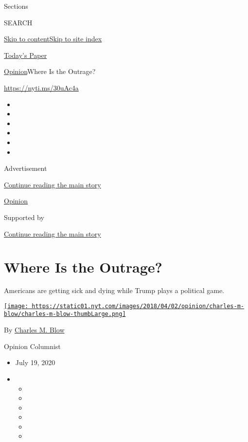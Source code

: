 Sections

SEARCH

\protect\hyperlink{site-content}{Skip to
content}\protect\hyperlink{site-index}{Skip to site index}

\href{https://myaccount.nytimes.com/auth/login?response_type=cookie\&client_id=vi}{}

\href{https://www.nytimes.com/section/todayspaper}{Today's Paper}

\href{/section/opinion}{Opinion}\textbar{}Where Is the Outrage?

\href{https://nyti.ms/30uAc4a}{https://nyti.ms/30uAc4a}

\begin{itemize}
\item
\item
\item
\item
\item
\item
\end{itemize}

Advertisement

\protect\hyperlink{after-top}{Continue reading the main story}

\href{/section/opinion}{Opinion}

Supported by

\protect\hyperlink{after-sponsor}{Continue reading the main story}

\hypertarget{where-is-the-outrage}{%
\section{Where Is the Outrage?}\label{where-is-the-outrage}}

Americans are getting sick and dying while Trump plays a political game.

\href{https://www.nytimes.com/by/charles-m-blow}{\texttt{[image: https://static01.nyt.com/images/2018/04/02/opinion/charles-m-blow/charles-m-blow-thumbLarge.png]}}

By \href{https://www.nytimes.com/by/charles-m-blow}{Charles M. Blow}

Opinion Columnist

\begin{itemize}
\item
  July 19, 2020
\item
  \begin{itemize}
  \item
  \item
  \item
  \item
  \item
  \item
  \end{itemize}
\end{itemize}

